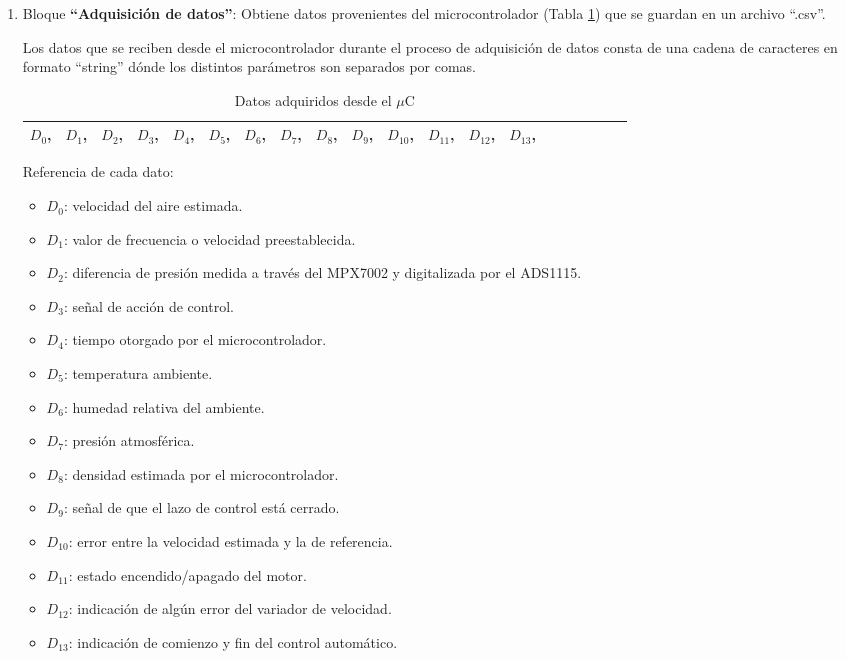 \begin{enumerate}
\item Bloque \textbf{“Adquisición de datos”}: 
\subitem Obtiene datos provenientes del microcontrolador (Tabla \ref{tab:Datosdesde}) que se guardan en un archivo “.csv”. 
 
Los datos que se reciben desde el microcontrolador durante el proceso de adquisición de datos consta de una cadena de caracteres en formato “string” dónde los distintos parámetros son separados por comas.
\begin{table}[H]
	\centering
	\begin{tabular}{|l|l|l|l|l|l|l|l|l|l|l|l|l|l|l|l|l|l|l|l|}
		\hline
		$D_0$,&$D_1$,&$D_2$,&$D_3$,&$D_4$,&$D_5$,&$D_6$,&$D_7$,&$D_8$,&$D_9$,&$D_{10}$,&$D_{11}$,&$D_{12}$,&$D_{13}$,  \\ \hline
	\end{tabular}
\caption{Datos adquiridos desde el $\mu$C}
\label{tab:Datosdesde}
\end{table}

Referencia de cada dato:
	\begin{itemize}
	\item $D_0$: velocidad del aire estimada.
	\item 	$D_1$: valor de frecuencia o velocidad preestablecida.
	\item 	$D_2$: diferencia de presión medida a través del MPX7002 y digitalizada por el ADS1115.
	\item 	$D_3$: señal de acción de control.
	\item 	$D_4$: tiempo otorgado por el microcontrolador.
	\item 	$D_5$: temperatura ambiente.
	\item 	$D_6$: humedad relativa del ambiente.
	\item 	$D_7$: presión atmosférica.
	\item 	$D_8$: densidad estimada por el microcontrolador.
	\item 	$D_9$: señal de que el lazo de control está cerrado.
	\item 	$D_{10}$: error entre la velocidad estimada y la de referencia.
	\item 	$D_{11}$: estado encendido/apagado del motor.
	\item 	$D_{12}$: indicación de algún error del variador de velocidad.
	\item 	$D_{13}$: indicación de comienzo y fin del control automático.\\
	\end{itemize}	



\end{enumerate}
